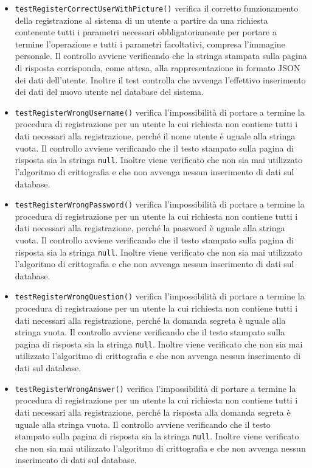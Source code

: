 \begin{itemize}
\begin{itemize}
\item \texttt{testRegisterCorrectUserWithPicture()}
verifica il corretto funzionamento della registrazione al sistema di un utente a partire da una richiesta contenente tutti i parametri necessari obbligatoriamente per portare a termine l'operazione e tutti i parametri facoltativi, compresa l'immagine personale. 
Il controllo avviene verificando che la stringa stampata sulla pagina di risposta corrisponda, come attesa, alla rappresentazione in formato JSON dei dati dell'utente. Inoltre il test controlla che avvenga l'effettivo inserimento dei dati del nuovo utente nel database del sistema.

\item \texttt{testRegisterWrongUsername()} 
verifica l'impossibilità di portare a termine la procedura di registrazione per un utente la cui richiesta non contiene tutti i dati necessari alla registrazione, perché il nome utente è uguale alla stringa vuota. Il controllo avviene verificando che il testo stampato sulla pagina di risposta sia la stringa \texttt{null}. Inoltre viene verificato che non sia mai utilizzato l'algoritmo di crittografia e che non avvenga nessun inserimento di dati sul database.

\item \texttt{testRegisterWrongPassword()} 
verifica l'impossibilità di portare a termine la procedura di registrazione per un utente la cui richiesta non contiene tutti i dati necessari alla registrazione, perché la password è uguale alla stringa vuota. Il controllo avviene verificando che il testo stampato sulla pagina di risposta sia la stringa \texttt{null}. Inoltre viene verificato che non sia mai utilizzato l'algoritmo di crittografia e che non avvenga nessun inserimento di dati sul database.

\item \texttt{testRegisterWrongQuestion()} 
verifica l'impossibilità di portare a termine la procedura di registrazione per un utente la cui richiesta non contiene tutti i dati necessari alla registrazione, perché la domanda segreta è uguale alla stringa vuota. Il controllo avviene verificando che il testo stampato sulla pagina di risposta sia la stringa \texttt{null}. Inoltre viene verificato che non sia mai utilizzato l'algoritmo di crittografia e che non avvenga nessun inserimento di dati sul database.

\item \texttt{testRegisterWrongAnswer()} 
verifica l'impossibilità di portare a termine la procedura di registrazione per un utente la cui richiesta non contiene tutti i dati necessari alla registrazione, perché la risposta alla domanda segreta è uguale alla stringa vuota. Il controllo avviene verificando che il testo stampato sulla pagina di risposta sia la stringa \texttt{null}. Inoltre viene verificato che non sia mai utilizzato l'algoritmo di crittografia e che non avvenga nessun inserimento di dati sul database.


\end{itemize}
\end{itemize}
